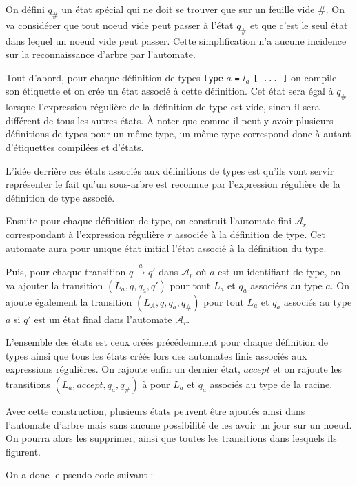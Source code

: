 \documentclass[a4paper, 11pt]{article}
\begin{document}
On défini $q_\#$ un état spécial qui ne doit se trouver que sur un feuille vide
$\#$. On va considérer que tout noeud vide peut passer à l'état $q_\#$ et que
c'est le seul état dans lequel un noeud vide peut passer. Cette simplification
n'a aucune incidence sur la reconnaissance d'arbre par l'automate.

Tout d'abord, pour chaque définition de types \texttt{type} $a$ \texttt{=} $l_a$
\texttt{[ ... ]} on compile son étiquette et on crée un état associé à cette
définition. Cet état sera égal à $q_\#$ lorsque l'expression régulière de la
définition de type est vide, sinon il sera différent de tous les autres états. À
noter que comme il peut y avoir plusieurs définitions de types pour un même
type, un même type correspond donc à autant d'étiquettes compilées et d'états.

L'idée derrière ces états associés aux définitions de types est qu'ils vont
servir représenter le fait qu'un sous-arbre est reconnue par l'expression
régulière de la définition de type associé.

Ensuite pour chaque définition de type, on construit l'automate fini
$\mathcal{A}_r$ correspondant à l'expression régulière $r$ associée à la
définition de type. Cet automate aura pour unique état initial l'état associé à
la définition du type.

Puis, pour chaque transition $q \xrightarrow{a} q'$ dans $\mathcal{A}_r$ où $a$
est un identifiant de type, on va ajouter la transition $(L_a, q, q_a, q')$ pour
tout $L_a$ et $q_a$ associées au type $a$. On ajoute également la transition
$(L_A, q, q_a, q_\#)$ pour tout $L_a$ et $q_a$ associés au type $a$ si $q'$ est
un état final dans l'automate $\mathcal{A}_r$.

L'ensemble des états est ceux créés précédemment pour chaque définition de types
ainsi que tous les états créés lors des automates finis associés aux expressions
régulières. On rajoute enfin un dernier état, $accept$ et on rajoute les
transitions $(L_a, accept, q_a, q_\#)$ à pour $L_a$ et $q_a$ associés au type de
la racine.

Avec cette construction, plusieurs états peuvent être ajoutés ainsi dans
l'automate d'arbre mais sans aucune possibilité de les avoir un jour sur un
noeud. On pourra alors les supprimer, ainsi que toutes les transitions dans
lesquels ils figurent.

On a donc le pseudo-code suivant :
\end{document}

